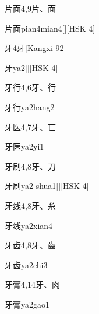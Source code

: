 \begin{entry}{片面}{4,9}{⽚、⾯}
  \begin{phonetics}{片面}{pian4mian4}[][HSK 4]
  \end{phonetics}
\end{entry}

\begin{entry}{牙}{4}{⽛}[Kangxi 92]
  \begin{phonetics}{牙}{ya2}[][HSK 4]
  \end{phonetics}
\end{entry}

\begin{entry}{牙行}{4,6}{⽛、⾏}
  \begin{phonetics}{牙行}{ya2hang2}
  \end{phonetics}
\end{entry}

\begin{entry}{牙医}{4,7}{⽛、⼖}
  \begin{phonetics}{牙医}{ya2yi1}
  \end{phonetics}
\end{entry}

\begin{entry}{牙刷}{4,8}{⽛、⼑}
  \begin{phonetics}{牙刷}{ya2 shua1}[][HSK 4]
  \end{phonetics}
\end{entry}

\begin{entry}{牙线}{4,8}{⽛、⽷}
  \begin{phonetics}{牙线}{ya2xian4}
  \end{phonetics}
\end{entry}

\begin{entry}{牙齿}{4,8}{⽛、⿒}
  \begin{phonetics}{牙齿}{ya2chi3}
  \end{phonetics}
\end{entry}

\begin{entry}{牙膏}{4,14}{⽛、⾁}
  \begin{phonetics}{牙膏}{ya2gao1}
  \end{phonetics}
\end{entry}

